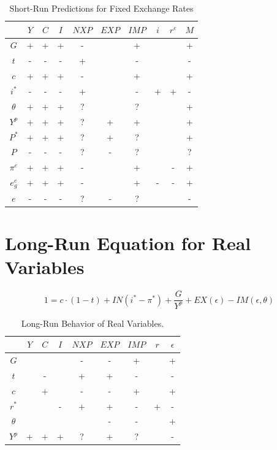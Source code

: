 \documentclass[
  letterpaper,
]{book}
\theoremstyle{plain}
\theoremstyle{remark}
\begin{document}
\begin{table}

\begin{tabular}
{*{10}{|c}|}
\hline

        &$Y$    &$C$    &$I$    &$NXP$  &$EXP$  &$IMP$  &$i$    &$r^e$ &$M$\\ \hline
$G$     &+  &+  &+  &-  &   &+  &   &   &+\\ \hline
$t$     &-  &-  &-  &+  &   &-  &   &   &-\\ \hline
$c$     &+  &+  &+  &-  &   &+  &   &   &+\\ \hline
$i^*$       &-  &-  &-  &+  &   &-  &+  &+  &-\\ \hline
$\theta$    &+  &+  &+  &?  &   &?  &   &   &+\\ \hline
$Y^p$       &+  &+  &+  &?  &+  &+  &   &   &+\\ \hline
$P^*$       &+  &+  &+  &?  &+  &?  &   &   &+\\ \hline
$P$     &-  &-  &-  &?  &-  &?  &   &   &?\\ \hline
$\pi^e$ &+  &+  &+  &-  &   &+  &   &-  &+\\ \hline
$e_g^e$     &+  &+  &+  &-  &   &+  &-  &-  &+\\ \hline
$e$     &-  &-  &-  &?  &-  &?  &   &   &- \\ \hline

\end{tabular}
\caption{Short-Run Predictions for Fixed Exchange Rates}
\end{table}

\section{Long-Run Equation for Real Variables}

\[
1=c\cdot (1-t)+IN(i^*-\pi^*)+\frac{G}{Y^p}+EX(\epsilon)-IM(\epsilon,\theta)
\]

\begin{table}
\begin{tabular}
{*{9}{|c}|}
\hline

    &$Y$    &$C$    &$I$    &$NXP$  &$EXP$  &$IMP$  &$r$    &$\epsilon$\\ \hline
$G$ &   &   &   &-  &-  &+  &   &+  \\ \hline
$t$ &   &-  &   &+  &+  &-  &   &-  \\ \hline
$c$ &   &+  &   &-  &-  &+  &   &+  \\ \hline
$r^*$   &   &   &-  &+  &+  &-  &+  &-  \\ \hline
$\theta$    &   &   &   &   &-  &-  &   &+  \\ \hline
$Y^p$   &+  &+  &+  &?  &+  &?  &   &-  \\ \hline

\end{tabular}
\caption{Long-Run Behavior of Real Variables.}
\end{table}
\end{document}

